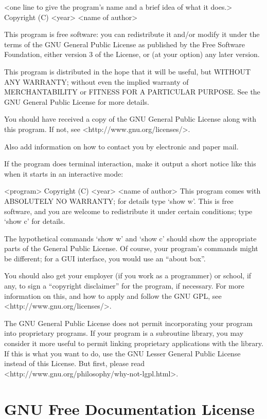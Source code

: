 {\begin{multicols}{4}
    <one line to give the program's name and a brief idea of what it does.>
    Copyright (C) <year>  <name of author>

    This program is free software: you can redistribute it and/or modify
    it under the terms of the GNU General Public License as published by
    the Free Software Foundation, either version 3 of the License, or
    (at your option) any later version.

    This program is distributed in the hope that it will be useful,
    but WITHOUT ANY WARRANTY; without even the implied warranty of
    MERCHANTABILITY or FITNESS FOR A PARTICULAR PURPOSE.  See the
    GNU General Public License for more details.

    You should have received a copy of the GNU General Public License
    along with this program.  If not, see <http://www.gnu.org/licenses/>.

Also add information on how to contact you by electronic and paper mail.

If the program does terminal interaction, make it output a short notice like this when it starts in an interactive mode:

    <program>  Copyright (C) <year>  <name of author>
    This program comes with ABSOLUTELY NO WARRANTY; for details type `show w'.
    This is free software, and you are welcome to redistribute it
    under certain conditions; type `show c' for details.

The hypothetical commands `show w' and `show c' should show the appropriate parts of the General Public License. Of course, your program's commands might be different; for a GUI interface, you would use an “about box”.

You should also get your employer (if you work as a programmer) or school, if any, to sign a “copyright disclaimer” for the program, if necessary. For more information on this, and how to apply and follow the GNU GPL, see <http://www.gnu.org/licenses/>.

The GNU General Public License does not permit incorporating your program into proprietary programs. If your program is a subroutine library, you may consider it more useful to permit linking proprietary applications with the library. If this is what you want to do, use the GNU Lesser General Public License instead of this License. But first, please read <http://www.gnu.org/philosophy/why-not-lgpl.html>.
\end{multicols}

\section{GNU Free Documentation License}
\begin{multicols}{4}


\end{multicols}}

